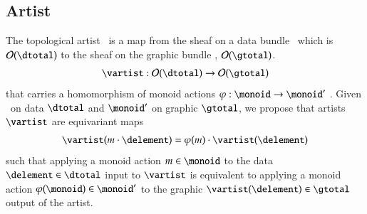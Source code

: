 \documentclass[journal]{vgtc}                %
\begin{document}
\subsection{Artist}
The topological artist \vartist\ is a map from the sheaf on a data bundle \dtotal\ which is $\mathcal{O}(\dtotal)$ to the sheaf on the graphic bundle \gtotal, $\mathcal{O}(\gtotal)$. 
\begin{equation}
    \vartist: \mathcal{O}(\dtotal) \rightarrow \mathcal{O}(\gtotal)
\end{equation}
that carries a homomorphism of monoid actions $\varphi: \monoid \rightarrow \monoid^{\prime}$ \cite{cegarraCohomologyMonoidsOperators2019}. Given \monoid\ on data $\mathscr{\dtotal}$ and $\monoid^{\prime}$ on graphic $\mathscr{\gtotal}$, we propose that artists $\mathscr{\vartist}$ are equivariant maps 
\begin{equation}
\vartist(m\cdot \delement) = \varphi(m)\cdot \vartist(\delement) 
\end{equation}
such that applying a monoid action $m \in \monoid$ to the data $\delement \in \mathscr{\dtotal}$ input to $\mathscr{\vartist}$ is equivalent to applying a monoid action $\varphi(\monoid) \in \monoid^{\prime}$ to the graphic $\vartist(\delement) \in \mathscr{\gtotal}$ output of the artist.
\end{document}
